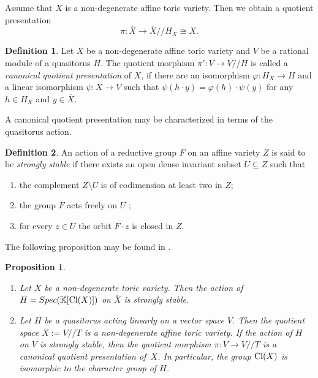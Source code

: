 \documentclass[12pt,a4paper]{amsart}
\theoremstyle{plain}
\newtheorem{proposition}{Proposition}
\theoremstyle{definition}
\newtheorem{definition}{Definition}
\begin{document}
Assume that $X$ is a non-degenerate affine toric variety. Then we obtain a
quotient presentation
$$
\pi: \overline{X} \to \overline{X}/\!/H_X \cong X.
$$

\begin{definition}
Let $X$ be a non-degenerate affine toric variety and $V$ be a rational module of
a quasitorus $H$. The quotient morphism $\pi': V\to V/\!/ H$ is called a
{\it canonical quotient presentation} of $X$, if there are an isomorphism
$\varphi: H_X \to H$ and a linear isomorphism $\psi: \overline{X}\to V$
such that $\psi(h\cdot y)=\varphi(h)\cdot\psi(y)$ for any $h\in H_X$ and
$y\in\overline{X}$.
\end{definition}

A canonical quotient presentation may be characterized in terms of the quasitorus action.

\begin{definition}
An action of a reductive group $F$ on an affine variety $Z$ is said to be
{\it strongly stable} if there exists an open dense invariant subset $U\subseteq Z$ such that
\begin{enumerate}
\item
the complement $Z\setminus U$ is of codimension at least two in $Z$;
\item
the group $F$ acts freely on $U$ ;
\item
for every $z\in U$ the orbit $F\cdot z$ is closed in $Z$.
\end{enumerate}
\end{definition}

The following proposition may be found in \cite[Remark~6.4.2 and Theorem~6.4.3]{ADHL}.

\begin{proposition} \label{propstst}
\begin{enumerate}
\item
Let $X$ be a non-degenerate toric variety. Then the action of $H=Spec({{\mathbb K}}[{\mathop{\rm Cl}}(X)])$ on
$\overline{X}$ is strongly stable.
\item
Let $H$ be a quasitorus acting linearly on a vector space $V$. Then
the quotient space $X:=V/\!/T$ is a non-degenerate affine toric variety.
If the action of $H$ on $V$ is strongly stable, then the quotient morphism
$\pi: V \to V/\!/T$ is a canonical quotient presentation of~$X$. In particular,
the group ${\mathop{\rm Cl}}(X)$ is isomorphic to the character group of $H$.
\end{enumerate}
\end{proposition}
\end{document}
